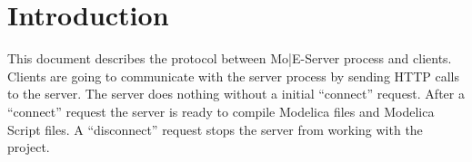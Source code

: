\section{Introduction}
This document describes the protocol between Mo|E-Server process and clients.
Clients are going to communicate with the server process by sending HTTP calls to the server.
The server does nothing without a initial ``connect'' request. After a ``connect'' request the server
is ready to compile Modelica files and Modelica Script files. A ``disconnect'' request stops the server
from working with the project.
